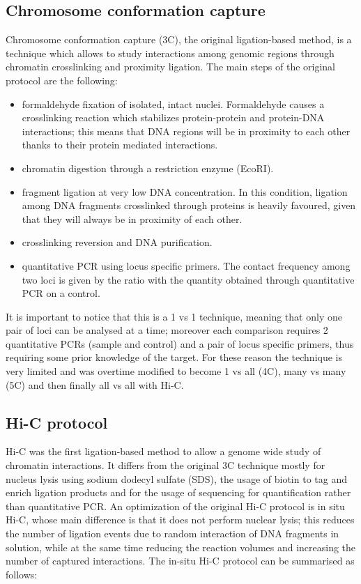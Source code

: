 \subsection{Chromosome conformation capture}
Chromosome conformation capture (3C), the original ligation-based method, is a technique which allows to study interactions among genomic regions through chromatin crosslinking and proximity ligation\cite{3coriginal2002}. The main steps of the original protocol are the following:
\begin{itemize}\tightlist
  \item formaldehyde fixation of isolated, intact nuclei. Formaldehyde causes a crosslinking reaction which stabilizes protein-protein and protein-DNA interactions; this means that DNA regions will be in proximity to each other thanks to their protein mediated interactions. 
  \item chromatin digestion through a restriction enzyme (EcoRI).
  \item fragment ligation at very low DNA concentration. In this condition, ligation among DNA fragments crosslinked through proteins is heavily favoured, given that they will always be in proximity of each other.
  \item crosslinking reversion and DNA purification.
  \item quantitative PCR using locus specific primers. The contact frequency among two loci is given by the ratio with the quantity obtained through quantitative PCR on a control.
\end{itemize}
It is important to notice that this is a 1 vs 1 technique, meaning that only one pair of loci can be analysed at a time; moreover each comparison requires 2 quantitative PCRs (sample and control) and a pair of locus specific primers, thus requiring some prior knowledge of the target. For these reason the technique is very limited and was overtime modified to become 1 vs all (4C\cite{4cprotocol2006}), many vs many (5C\cite{5cprotocol2006}) and then finally all vs all with Hi-C.


\subsection{Hi-C protocol}
Hi-C was the first ligation-based method to allow a genome wide study of chromatin interactions. It differs from the original 3C technique mostly for nucleus lysis using sodium dodecyl sulfate (SDS), the usage of biotin to tag and enrich ligation products and for the usage of sequencing for quantification rather than quantitative PCR\cite{hicoriginal2009}. An optimization of the original Hi-C protocol is in situ Hi-C, whose main difference is that it does not perform nuclear lysis; this reduces the number of ligation events due to random interaction of DNA fragments in solution, while at the same time reducing the reaction volumes and increasing the number of captured interactions\cite{insituhic2014}. The in-situ Hi-C protocol can be summarised as follows:

